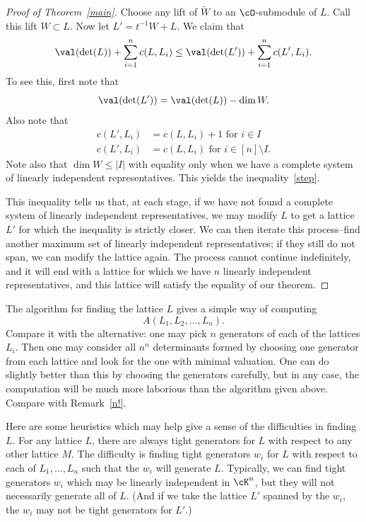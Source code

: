 \begin{proof}[Proof of Theorem~\ref{main}]
Choose any lift of $\tilde{W}$ to an $\cO$-submodule of $L$. Call this lift $W \subset L$. Now let $L' = t^{-1}W + L$. We claim that
\begin{equation} \label{step}
\val(\det(L)) + \sum_{i=1}^n c(L,L_i) \leq \val(\det(L')) + \sum_{i=1}^n c(L',L_i) .
\end{equation}
To see this, first note that 
\[
\val(\det(L')) = \val(\det(L)) - \dim W.
\]
Also note that 
\begin{align*}
c(L',L_i) &= c(L,L_i) + 1 \text{ for } i \in I
\\
c(L',L_i) &= c(L,L_i) \text{ for } i \in [n] \setminus I.
\end{align*}
Note also that $\dim W \leq |I|$ with equality only when we have a complete system of linearly independent representatives. This yields the inequality~\eqref{step}.

This inequality tells us that, at each stage, if we have not found a complete system of linearly independent representatives, we may modify $L$ to get a lattice $L'$ for which the inequality is strictly closer. We can then iterate this process--find another maximum set of linearly independent representatives; if they still do not span, we can modify the lattice again. The process cannot continue indefinitely, and it will end with a lattice for which we have $n$ linearly independent representatives, and this lattice will satisfy the equality of our theorem.
\end{proof}

\begin{rema} \label{n^n} The algorithm for finding the lattice $L$ gives a simple way of computing 
\[
A(L_1, L_2, \dots, L_n).
\] 
Compare it with the alternative: one may pick $n$ generators of each of the lattices $L_i$. Then one may consider all $n^n$ determinants formed by choosing one generator from each lattice and look for the one with minimal valuation. One can do slightly better than this by choosing the generators carefully, but in any case, the computation will be much more laborious than the algorithm given above. Compare with Remark~\ref{n!}.
\end{rema}

\begin{rema} Here are some heuristics which may help give a sense of the difficulties in finding $L$. For any lattice $L$, there are always tight generators for $L$ with respect to any other lattice $M$. The difficulty is finding tight generators $w_i$ for $L$ with respect to each of $L_1, \dots, L_n$ such that the $w_i$ will generate $L$. Typically, we can find tight generators $w_i$ which may be linearly independent in $\cK^n$, but they will not necessarily generate all of $L$. (And if we take the lattice $L'$ spanned by the $w_i$, the $w_i$ may not be tight generators for $L'$.)
\end{rema}

